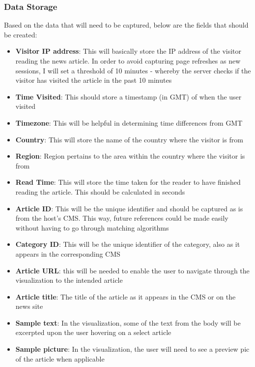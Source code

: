 \documentclass[12pt]{article}
\begin{document}
\subsubsection{Data Storage}
Based on the data that will need to be captured, below are the fields that should be created:
\begin{itemize}
\item \textbf{Visitor IP address}: This will basically store the IP address of the visitor reading the news article. In order to avoid capturing page refreshes as new sessions, I will set a threshold of 10 minutes - whereby the server checks if the visitor has visited the article in the past 10 minutes
\item \textbf{Time Visited}: This should store a timestamp (in GMT) of when the user visited 
\item \textbf{Timezone}: This will be helpful in determining time differences from GMT
\item \textbf{Country}: This will store the name of the country where the visitor is from
\item \textbf{Region}: Region pertains to the area within the country where the visitor is from
\item \textbf{Read Time}: This will store the time taken for the reader to have finished reading the article. This should be calculated in seconds
\item \textbf{Article ID}: This will be the unique identifier and should be captured as is from the host's CMS. This way, future references could be made easily without having to go through matching algorithms
\item \textbf{Category ID}: This will be the unique identifier of the category, also as it appears in the corresponding CMS
\item \textbf{Article URL}: this will be needed to enable the user to navigate through the visualization to the intended article
\item \textbf{Article title}: The title of the article as it appears in the CMS or on the news site
\item \textbf{Sample text}: In the visualization, some of the text from the body will be excerpted upon the user hovering on a select article
\item \textbf{Sample picture}: In the visualization, the user will need to see a preview pic of the article when applicable 

\end{itemize}
\end{document}
